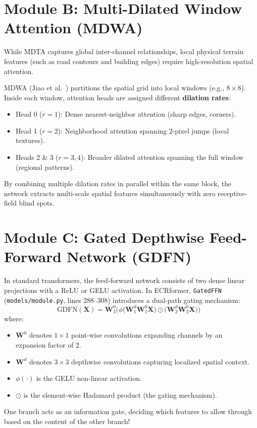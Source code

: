 \section{Module B: Multi-Dilated Window Attention (MDWA)}
While MDTA captures global inter-channel relationships, local physical terrain features (such as road contours and building edges) require high-resolution spatial attention.

MDWA (Jiao et al.~\cite{jiao2023dilateformer}) partitions the spatial grid into local windows (e.g., $8 \times 8$). Inside each window, attention heads are assigned different \textbf{dilation rates}:
\begin{itemize}
    \item Head 0 ($r=1$): Dense nearest-neighbor attention (sharp edges, corners).
    \item Head 1 ($r=2$): Neighborhood attention spanning 2-pixel jumps (local textures).
    \item Heads 2 \& 3 ($r=3, 4$): Broader dilated attention spanning the full window (regional patterns).
\end{itemize}
By combining multiple dilation rates in parallel within the same block, the network extracts multi-scale spatial features simultaneously with zero receptive-field blind spots.

\section{Module C: Gated Depthwise Feed-Forward Network (GDFN)}
In standard transformers, the feed-forward network consists of two dense linear projections with a ReLU or GELU activation. In ECRformer, \texttt{GatedFFN} (\texttt{models/module.py}, lines 288--308) introduces a dual-path gating mechanism:
\begin{equation}
\text{GDFN}(\mathbf{X}) = \mathbf{W}_3^0 \Big( \phi\big(\mathbf{W}_1^d \mathbf{W}_1^0 \mathbf{X}\big) \odot \big(\mathbf{W}_2^d \mathbf{W}_2^0 \mathbf{X}\big) \Big)
\end{equation}
where:
\begin{itemize}
    \item $\mathbf{W}^0$ denotes $1 \times 1$ point-wise convolutions expanding channels by an expansion factor of 2.
    \item $\mathbf{W}^d$ denotes $3 \times 3$ depthwise convolutions capturing localized spatial context.
    \item $\phi(\cdot)$ is the GELU non-linear activation.
    \item $\odot$ is the element-wise Hadamard product (the gating mechanism).
\end{itemize}
One branch acts as an information gate, deciding which features to allow through based on the content of the other branch!

